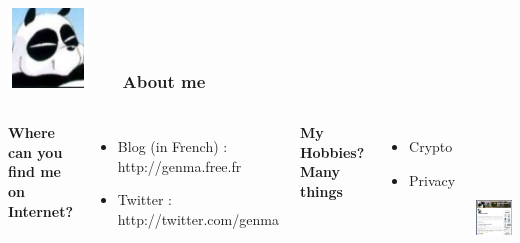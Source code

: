 
\begin{frame}
\frametitle{\includegraphics[scale=0.4]{./materials/Genma.jpg} \ \ \  About me }
\begin{columns}[c] 

\textbf{Where can you find me on Internet?}
\begin{itemize}
\item Blog (in French) : http://genma.free.fr
\item Twitter : http://twitter.com/genma
\end{itemize}

\textbf{My Hobbies? Many things}
\begin{itemize}
\item Crypto
\item Privacy
\end{itemize}

\includegraphics[width=5cm,height=5cm]{./materials/blog.png} 
\end{columns}
\end{frame}


